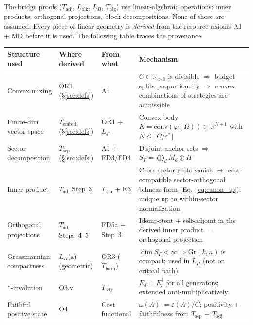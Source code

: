 \documentclass[11pt]{article}
\theoremstyle{remark}
\begin{document}
\begin{tcolorbox}[defbox, title={Linear Structure Provenance: Where Each Piece of Geometry Enters}]
\label{box:provenance}
The bridge proofs ($T_{\mathrm{adj}}$, $L_{\mathrm{blk}}$, $L_\Pi$, $T_{\mathrm{alg}}$) use linear-algebraic operations: inner products, orthogonal projections, block decompositions.  None of these are assumed.  Every piece of linear geometry is \emph{derived} from the resource axioms A1 + MD before it is used.  The following table traces the provenance.

\smallskip
\begin{center}
\small
\begin{tabular}{@{}p{2.8cm}p{2.8cm}p{2.0cm}p{4.5cm}@{}}
\textbf{Structure used} & \textbf{Where derived} & \textbf{From what} & \textbf{Mechanism} \\[2pt]
\hline\noalign{\smallskip}
Convex mixing & OR1 (\S\ref{sec:defs}) & A1 & $C \in \mathbb{R}_{>0}$ is divisible $\Rightarrow$ budget splits proportionally $\Rightarrow$ convex combinations of strategies are admissible \\[4pt]
Finite-dim vector space & $T_{\mathrm{embed}}$ (\S\ref{sec:defs}) & OR1 + $L_{\varepsilon^*}$ & Convex body $K = \mathrm{conv}(\varphi(\Omega)) \subset \mathbb{R}^{N+1}$ with $N \le \lfloor C/\varepsilon^* \rfloor$ \\[4pt]
Sector decomposition & $T_{\mathrm{sep}}$ (\S\ref{sec:defs}) & A1 + FD3/FD4 & Disjoint anchor sets $\Rightarrow$ $S_\Gamma = \bigoplus_d M_d \oplus \Pi$ \\[4pt]
Inner product & $T_{\mathrm{adj}}$ Step~3 & $T_{\mathrm{sep}}$ + K3 & Cross-sector costs vanish $\Rightarrow$ cost-compatible sector-orthogonal bilinear form (Eq.~\ref{eq:canon_ip}); unique up to within-sector normalization \\[4pt]
Orthogonal projections & $T_{\mathrm{adj}}$ Steps~4--5 & FD5a + Step~3 & Idempotent + self-adjoint in the derived inner product $= $ orthogonal projection \\[4pt]
Grassmannian compactness & $L_\Pi$(a) (geometric) & OR3 ($T_{\mathrm{form}}$) & $\dim S_\Gamma < \infty \Rightarrow \mathrm{Gr}(k,n)$ is compact; used in $L_\Pi$ (not on critical path) \\[4pt]
$*$-involution & O3.v & $T_{\mathrm{adj}}$ & $E_d = E_d^\dagger$ for all generators; extended anti-multiplicatively \\[4pt]
Faithful positive state & O4 & Cost functional & $\omega(A) := \varepsilon(A)/C$; positivity + faithfulness from $T_{\mathrm{sep}}$ + $T_{\mathrm{adj}}$ \\
\end{tabular}
\end{center}


\end{tcolorbox}
\end{document}
